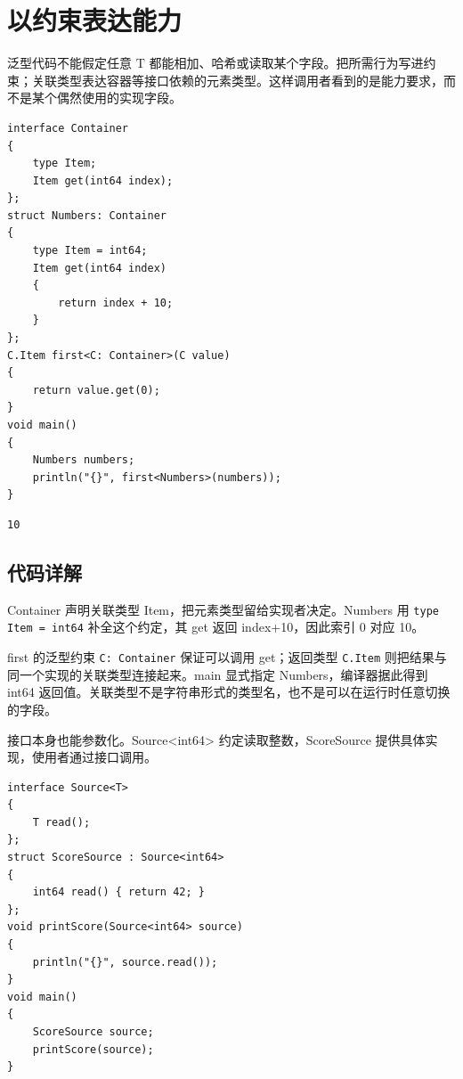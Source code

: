 \section{以约束表达能力}

泛型代码不能假定任意 T 都能相加、哈希或读取某个字段。把所需行为写进约束；关联类型表达容器等接口依赖的元素类型。这样调用者看到的是能力要求，而不是某个偶然使用的实现字段。

\par
\medskip
\begin{lstlisting}[style=chali]
interface Container
{
    type Item;
    Item get(int64 index);
};
struct Numbers: Container
{
    type Item = int64;
    Item get(int64 index)
    {
        return index + 10;
    }
};
C.Item first<C: Container>(C value)
{
    return value.get(0);
}
void main()
{
    Numbers numbers;
    println("{}", first<Numbers>(numbers));
}
\end{lstlisting}
\par
\medskip

\par
\medskip
\begin{lstlisting}[style=out]
10
\end{lstlisting}
\par
\medskip

\subsection*{代码详解}

Container 声明关联类型 Item，把元素类型留给实现者决定。Numbers 用 \texttt{type Item =\allowbreak{} int64} 补全这个约定，其 get 返回 index+10，因此索引 0 对应 10。

first 的泛型约束 \texttt{C:\allowbreak{} Container} 保证可以调用 get；返回类型 \texttt{C.\allowbreak{}Item} 则把结果与同一个实现的关联类型连接起来。main 显式指定 Numbers，编译器据此得到 int64 返回值。关联类型不是字符串形式的类型名，也不是可以在运行时任意切换的字段。

接口本身也能参数化。Source<int64> 约定读取整数，ScoreSource 提供具体实现，使用者通过接口调用。

\par
\medskip
\begin{lstlisting}[style=chali]
interface Source<T>
{
    T read();
};
struct ScoreSource : Source<int64>
{
    int64 read() { return 42; }
};
void printScore(Source<int64> source)
{
    println("{}", source.read());
}
void main()
{
    ScoreSource source;
    printScore(source);
}
\end{lstlisting}
\par
\medskip

